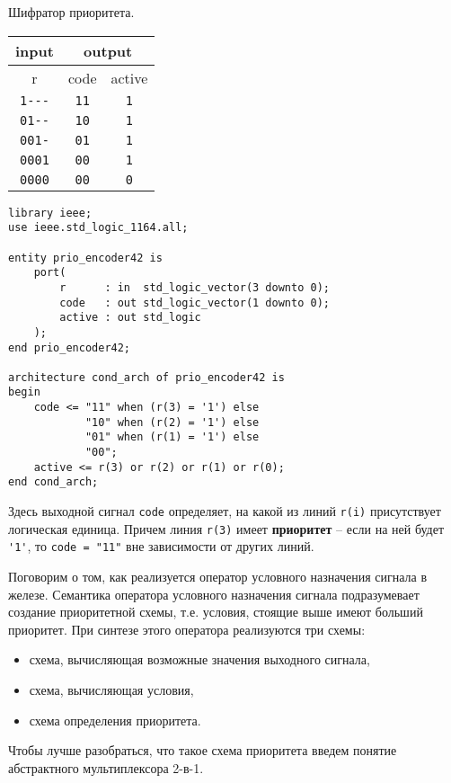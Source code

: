  Шифратор приоритета.
\begin{table}[h]
\centering
\begin{tabular}{|c|c|c|}
\hline
input               & \multicolumn{2}{c|}{output} \\ \hline
r                   & code        & active         \\ \hline
\texttt{1{-}{-}{-}} & \texttt{11} & \texttt{1}     \\
\texttt{01{-}{-}}   & \texttt{10} & \texttt{1}     \\
\texttt{001-}       & \texttt{01} & \texttt{1}     \\
\texttt{0001}       & \texttt{00} & \texttt{1}     \\
\texttt{0000}       & \texttt{00} & \texttt{0}     \\
\hline
\end{tabular}
\end{table}

\begin{Code}
\begin{lstlisting}
library ieee;
use ieee.std_logic_1164.all;

entity prio_encoder42 is
    port(
        r      : in  std_logic_vector(3 downto 0);
        code   : out std_logic_vector(1 downto 0);
        active : out std_logic
    );
end prio_encoder42;

architecture cond_arch of prio_encoder42 is
begin
    code <= "11" when (r(3) = '1') else
            "10" when (r(2) = '1') else
            "01" when (r(1) = '1') else
            "00";
    active <= r(3) or r(2) or r(1) or r(0);
end cond_arch;
\end{lstlisting}
\end{Code}

Здесь выходной сигнал \lstinline?code? определяет, на какой из линий \lstinline?r(i)? присутствует логическая единица. Причем линия \lstinline?r(3)? имеет \textbf{приоритет} – если на ней будет \lstinline?'1'?, то \lstinline?code = "11"? вне зависимости от других линий. 

Поговорим о том, как реализуется оператор условного назначения сигнала в железе. Семантика оператора условного назначения сигнала подразумевает создание приоритетной схемы, т.е. условия, стоящие выше имеют больший приоритет. При синтезе этого оператора реализуются три схемы:
\begin{itemize}
\item схема, вычисляющая возможные значения выходного сигнала,
\item схема, вычисляющая условия,
\item схема определения приоритета.
\end{itemize}
Чтобы лучше разобраться, что такое схема приоритета введем понятие абстрактного мультиплексора 2-в-1.

